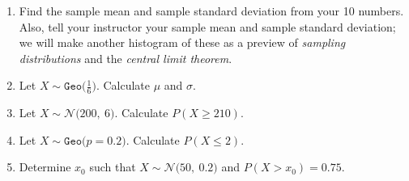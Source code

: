 \documentclass[12pt,letterpaper]{article}
\newcommand{\N}[2]{\mathcal{N}\big(#1,~#2\big)}
\newcommand{\Geo}[1]{\texttt{Geo}\big(#1\big)}
\begin{document}
\begin{enumerate}
\vfill

\item Find the sample mean and sample standard deviation from your 10 numbers. Also, tell your instructor your sample mean and sample standard deviation; we will make another histogram of these as a preview of \emph{sampling distributions} and the \emph{central limit theorem}.
\vfill

\item Let $X\sim \Geo{\frac{1}{6}}$. Calculate $\mu$ and $\sigma$.
\vfill

\newpage
{}
\item Let $X\sim\N{200}{6}$. Calculate $P(X\ge 210)$.
\vfill
\item Let $X\sim\Geo{p=0.2}$. Calculate $P(X\le 2)$.
\vfill
\item Determine $x_0$ such that $X\sim \N{50}{0.2}$ and $P(X>x_0)=0.75$.
\vfill

\end{enumerate}
\end{document}
